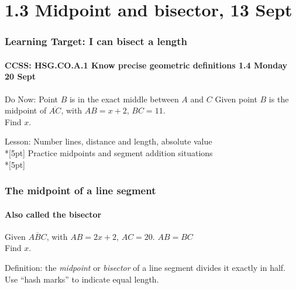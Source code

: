 \documentclass{beamer}
\begin{document}
  \section{1.3 Midpoint and bisector, 13 Sept}
  \frame
  {
    \frametitle{Learning Target: I can bisect a length}
    \framesubtitle{CCSS: HSG.CO.A.1 Know precise geometric definitions  \hfill \alert{1.4 Monday 20 Sept}}
  
    \begin{block}{Do Now: Point $B$ is in the exact middle between $A$ and $C$}
      Given point $B$ is the midpoint of $\overline{AC}$, with $AB=x+2$, $BC=11$. \\[0.25cm]
      Find $x$.
        \begin{center}
        \end{center}
    \end{block}
    Lesson: Number lines, distance and length, absolute value \\*[5pt]
    Practice midpoints and segment addition situations \\*[5pt]
  }

  \frame
  {
    \frametitle{The midpoint of a line segment}
    \framesubtitle{Also called the bisector}
    Given $\overline{ABC}$, with $AB=2x+2$, $AC=20$. $AB=BC$ \\[0.15in]
    Find $x$.
      \begin{center}
      \end{center} \vspace{2cm}
      Definition: the \emph{midpoint} or \emph{bisector} of a line segment divides it exactly in half. Use ``hash marks'' to indicate equal length.
  }
\end{document}
